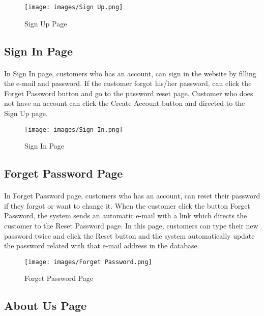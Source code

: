 \documentclass[12pt]{article}
\begin{document}
\bigskip
\bigskip
\bigskip
\begin{figure}[h]
\centerline{\texttt{[image: images/Sign Up.png]}}
\caption{Sign Up Page}
\label{fig}
\end{figure}

\newpage
\subsection{Sign In Page}
\bigskip
\paragraph{}
In Sign In page, customers who has an account, can sign in the website by filling the e-mail and password. If the customer forgot his/her password, can click the Forget Password button and go to the password reset page. Customer who does not have an account can click the Create Account button and directed to the Sign Up page. 

\bigskip
\bigskip
\bigskip
\begin{figure}[h]
\centerline{\texttt{[image: images/Sign In.png]}}
\caption{Sign In Page}
\label{fig}
\end{figure}

\newpage
\subsection{Forget Password Page}
\bigskip
\paragraph{}
In Forget Password page, customers who has an account, can reset their password if they forgot or want to change it. When the customer click the button Forget Password, the system sends an automatic e-mail with a link which directs the customer to the Reset Password page. In this page, customers can type their new password twice and click the Reset button and the system automatically update the password related with that e-mail address in the database. 
\bigskip
\bigskip
\bigskip
\begin{figure}[h]
\centerline{\texttt{[image: images/Forget Password.png]}}
\caption{Forget Password Page}
\label{fig}
\end{figure}

\newpage
\subsection{About Us Page}
\bigskip
\end{document}
